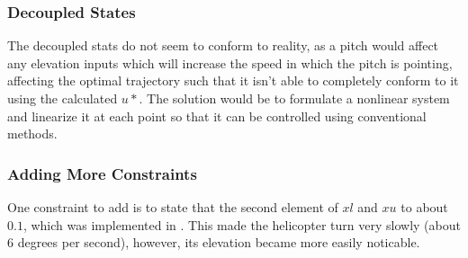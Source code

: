 \subsubsection{Decoupled States}
The decoupled stats do not seem to conform to reality, as a pitch would affect any elevation inputs which will increase the speed in which the pitch is pointing, affecting the optimal trajectory such that it isn't able to completely conform to it using the calculated $u*$. The solution would be to formulate a nonlinear system and linearize it at each point so that it can be controlled using conventional methods.

\subsubsection{Adding More Constraints}
One constraint to add is to state that the second element of $xl$ and $xu$ to about $0.1$, which was implemented in . This made the helicopter turn very slowly (about 6 degrees per second), however, its elevation became more easily noticable.
